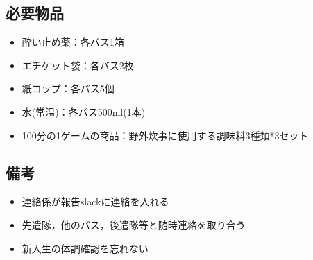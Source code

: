 \subsection{必要物品}
\begin{itemize}
\item 酔い止め薬：各バス1箱
\item エチケット袋：各バス2枚
\item 紙コップ：各バス5個
\item 水(常温)：各バス500ml(1本)
\item 100分の1ゲームの商品：野外炊事に使用する調味料3種類*3セット
\end{itemize}

\subsection{備考}

\begin{itemize}
\item 連絡係が報告slackに連絡を入れる
\item 先遣隊，他のバス，後遣隊等と随時連絡を取り合う
\item 新入生の体調確認を忘れない
\end{itemize}


